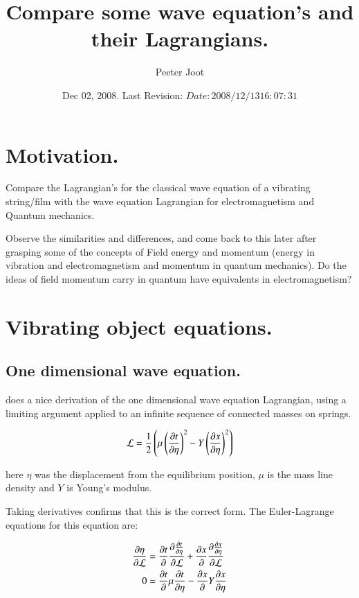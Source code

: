 \documentclass{article}
\title{ Compare some wave equation's and their Lagrangians. }
\author{Peeter Joot}
\date{ Dec 02, 2008.  Last Revision: $Date: 2008/12/13 16:07:31 $ }
\begin{document}
\maketitle{}

\tableofcontents

\section{ Motivation. }

Compare the Lagrangian's for the classical wave equation of a vibrating string/film with the wave equation Lagrangian for electromagnetism and Quantum mechanics.

Observe the similarities and differences, and come back to this later after grasping some of the concepts of Field energy and momentum (energy in vibration and electromagnetism and momentum in quantum mechanics).  Do the ideas of field momentum carry in quantum have equivalents in electromagnetism?

\section{ Vibrating object equations. }

\subsection{ One dimensional wave equation. }

\cite{goldstein1951cm} does a nice derivation of the one dimensional wave
equation Lagrangian, using a limiting argument applied to an infinite
sequence of connected masses on springs.

\begin{align}\label{eqn:oneDimensionalWaveLagrangian}
\mathcal{L} = \frac{1}{2} \left(\mu \left(\frac{\partial{t}}{\partial {\eta}}\right)^2 - Y \left(\frac{\partial{x}}{\partial {\eta}}\right)^2 \right)
\end{align}

here $\eta$ was the displacement from the equilibrium position, $\mu$ is the mass line density and $Y$ is Young's modulus.

Taking derivatives confirms that this is the correct form.  The Euler-Lagrange
equations for this equation are:

\begin{align*}
\frac{\partial{\eta}}{\partial {\mathcal{L}}} &= \frac{\partial{t}}{\partial {}} \frac{\partial{ \frac{\partial{t}}{\partial {\eta}} }}{\partial {\mathcal{L}}} +\frac{\partial{x}}{\partial {}} \frac{\partial{ \frac{\partial{x}}{\partial {\eta}} }}{\partial {\mathcal{L}}} \\
0 &= \frac{\partial{t}}{\partial {}} \mu \frac{\partial{t}}{\partial {\eta}} -\frac{\partial{x}}{\partial {}} Y \frac{\partial{x}}{\partial {\eta}} \\
\end{align*}
\end{document}
